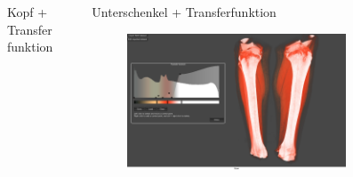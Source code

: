 \documentclass[final,hyperref={pdfpagelabels=false}]{beamer}
\begin{document}
\begin{frame}[t]
\begin{columns}[t]
\begin{column}{.465\textwidth}
\begin{block}{Kopf + Transferfunktion}
\end{block}


\end{column} %



\begin{column}{.025\textwidth}\end{column} %

\begin{column}{.465\textwidth}


\begin{block}{Unterschenkel + Transferfunktion}
  
    \begin{figure}
    	\center
        \includegraphics[width=0.8\textwidth]{KnieTransferfunktion}
        
    \end{figure}
   
     
   
   
\end{block}


\end{column} %



\begin{column}{.025\textwidth}\end{column} %

\end{columns} %


\begin{columns}[t] %


\end{columns}
\end{frame}
\end{document}
